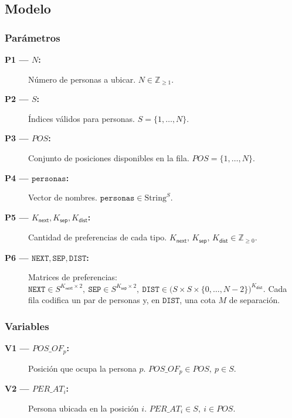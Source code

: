 
\subsection{Modelo}\label{sec:05-reunion-modelo}
\subsubsection*{Parámetros}
\begin{description}
  \item[\textbf{P1 — \(N\):}] Número de personas a ubicar. \(N\in\mathbb{Z}_{\ge 1}.\)
  \item[\textbf{P2 — \(S\):}] Índices válidos para personas. \(S=\{1,\dots,N\}.\)
  \item[\textbf{P3 — \(POS\):}] Conjunto de posiciones disponibles en la fila. \(POS=\{1,\dots,N\}.\)
  \item[\textbf{P4 — \(\texttt{personas}\):}] Vector de nombres. \(\texttt{personas}\in \text{String}^{S}.\)
  \item[\textbf{P5 — \(K_{\textsf{next}}, K_{\textsf{sep}}, K_{\textsf{dist}}\):}] Cantidad de preferencias de cada tipo. \(K_{\textsf{next}},\,K_{\textsf{sep}},\,K_{\textsf{dist}}\in\mathbb{Z}_{\ge 0}.\)
  \item[\textbf{P6 — \(\texttt{NEXT},\texttt{SEP},\texttt{DIST}\):}] Matrices de preferencias: \(\texttt{NEXT}\in S^{K_{\textsf{next}}\times 2},\ \texttt{SEP}\in S^{K_{\textsf{sep}}\times 2},\ \texttt{DIST}\in \big(S\times S\times \{0,\dots,N-2\}\big)^{K_{\textsf{dist}}}.\) Cada fila codifica un par de personas y, en \(\texttt{DIST}\), una cota \(M\) de separación.
\end{description}

\subsubsection*{Variables}
\begin{description}
  \item[\textbf{V1 — \(POS\_OF_p\):}] Posición que ocupa la persona \(p\). \(POS\_OF_p\in POS,\ p\in S.\)
  \item[\textbf{V2 — \(PER\_AT_i\):}] Persona ubicada en la posición \(i\). \(PER\_AT_i\in S,\ i\in POS.\)
\end{description}

